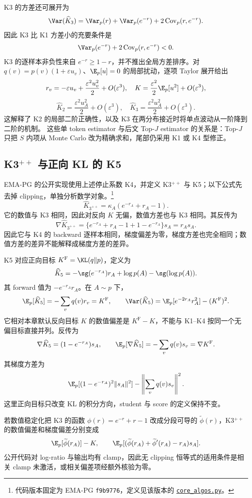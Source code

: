 K3 的方差还可展开为
\[
 \Var(\widehat K_3)
 =\Var_p(r)+\Var_p(e^{-r})+2\operatorname{Cov}_p(r,e^{-r}).
\]
因此 K3 比 K1 方差小的充要条件是
\[
 \Var_p(e^{-r})+2\operatorname{Cov}_p(r,e^{-r})<0.
\]
K3 的逐样本非负性来自 $e^{-r}\geq1-r$，并不推出全局方差排序。对 $q(v)=p(v)(1+\varepsilon u_v)$、$\E_p[u]=0$ 的局部扰动，逐项 Taylor 展开给出
\[
 r_v=-\varepsilon u_v+\frac{\varepsilon^2u_v^2}{2}+O(\varepsilon^3),
 \quad K=\frac{\varepsilon^2}{2}\E_p[u^2]+O(\varepsilon^3),
\]
\[
 \widehat K_2=\frac{\varepsilon^2u_A^2}{2}+O(\varepsilon^3),
 \quad \widehat K_3=\frac{\varepsilon^2u_A^2}{2}+O(\varepsilon^3).
\]
这解释了 K2 的局部二阶正确性，以及 K3 在两分布接近时将单点波动从一阶降到二阶的机制。
这些单 token estimator 与后文 Top-$J$ estimator 的关系是：Top-$J$ 只把 $S$ 内项从 Monte Carlo 改为精确求和，尾部仍采用 K1 或 K4 型修正。

\subsection{K3$^{++}$ 与正向 KL 的 K5}

EMA-PG 的公开实现使用上述停止系数 K4，并定义 K3$^{++}$ 与 K5；以下公式先去掉 clipping，单独分析数学对象。\footnote{代码版本固定为 EMA-PG \texttt{f9b9776}，定义见该版本的 \href{https://github.com/LunjunZhang/ema-pg/blob/f9b977632ad948ce935432a517c22291bfaba562/search/verl/trainer/ppo/core_algos.py}{\texttt{core\_algos.py}}。}
\[
 \widehat K_{3^{++}}=\kappa_A(e^{-r_A}+r_A-1).
\]
它的数值与 K3 相同，因此对反向 $K$ 无偏，数值方差也与 K3 相同。其反传为
\[
 \nabla\widehat K_{3^{++}}
 =\{e^{-r_A}+r_A-1+1-e^{-r_A}\}s_A=r_As_A.
\]
因此它与 K4 的 backward 逐样本相同，梯度偏差为零，梯度方差也完全相同；数值方差的差异不能解释成梯度方差的差异。

K5 对应正向目标 $K^{\mathrm F}=\KL(q\Vert p)$，定义为
\[
 \widehat K_5=-\sg(e^{-r_A})r_A+\log p(A)-\sg(\log p(A)).
\]
其 forward 值为 $-e^{-r_A}r_A$。在 $A\sim p$ 下，
\[
 \E_p[\widehat K_5]=-\sum_vq(v)r_v=K^{\mathrm F},\qquad
 \Var(\widehat K_5)=\E_p[e^{-2r_A}r_A^2]-(K^{\mathrm F})^2.
\]
它相对本章默认反向目标 $K$ 的数值偏差是 $K^{\mathrm F}-K$，不能与 K1--K4 按同一个无偏目标直接并列。反传为
\[
 \nabla\widehat K_5=(1-e^{-r_A})s_A,\qquad
 \E_p[\nabla\widehat K_5]=-\sum_vq(v)s_v=\nabla K^{\mathrm F}.
\]
其梯度方差为
\[
 \E_p[(1-e^{-r_A})^2\lVert s_A\rVert^2]
 -\left\lVert\sum_vq(v)s_v\right\rVert^2.
\]
这里正向目标只改变 KL 的积分方向，student 与 score 的定义保持不变。

若数值稳定化把 K3 的函数 $\phi(r)=e^{-r}+r-1$ 改成分段可导的 $\widetilde\phi(r)$，K3$^{++}$ 的数值偏差和梯度偏差分别变成
\[
 \E_p[\widetilde\phi(r_A)]-K,\qquad
 \E_p[(\widetilde\phi(r_A)+\widetilde\phi'(r_A)-r_A)s_A].
\]
公开代码对 log-ratio 与输出均有 clamp，因此无 clipping 恒等式的适用条件是相关 clamp 未激活，或相关偏差项经额外核验为零。

